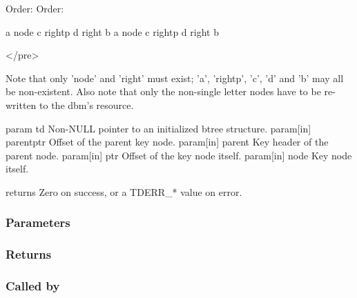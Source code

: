              Order:                          Order:

      a node c rightp d right b       a node c rightp d right b

</pre>

 Note that only 'node' and 'right' must exist; 'a', 'rightp', 'c', 'd'
 and 'b' may all be non-existent.
 Also note that only the non-single letter nodes have to be re-written
 to the dbm's resource.

 param td Non-NULL pointer to an initialized btree structure.
 param[in] parentptr Offset of the parent key node.
 param[in] parent Key header of the parent node.
 param[in] ptr Offset of the key node itself.
 param[in] node Key node itself.

 returns Zero on success, or a TDERR\_* value on error.
 

\subsubsection{Parameters}
\subsubsection{Returns}
\subsubsection{Called by}
